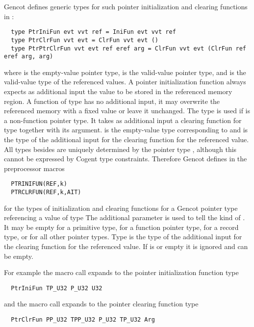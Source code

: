 Gencot defines generic types for such pointer initialization and clearing functions in :
\begin{verbatim}
  type PtrIniFun evt vvt ref = IniFun evt vvt ref
  type PtrClrFun vvt evt = ClrFun vvt evt ()
  type PtrPtrClrFun vvt evt ref eref arg = ClrFun vvt evt (ClrFun ref eref arg, arg)
\end{verbatim}
where  is the empty-value pointer type,  is the valid-value pointer type, and  is the valid-value
type of the referenced values. A pointer initialization function always expects as additional input the value to be stored in
the referenced memory region. A function of type  has no additional input, it may overwrite the referenced memory
with a fixed value or leave it unchanged. The type  is used if  is a non-function pointer type. It takes 
as additional input a clearing function for type  together with its argument.  is the empty-value type
corresponding to  and  is the type of the additional input for the clearing function for the referenced value. 
All types besides  are uniquely determined by the 
pointer type , although this cannot be expressed by Cogent type constraints. Therefore Gencot  defines in 
 the preprocessor macros
\begin{verbatim}
  PTRINIFUN(REF,k)
  PTRCLRFUN(REF,k,AIT)
\end{verbatim}
for the types of initialization and clearing functions for a Gencot pointer type referencing a value of type 
The additional parameter  is used to tell the kind of . It may be empty for a primitive type,
 for a function pointer type,  for a record type, or  for all other pointer types. Type 
is the type of the additional input for the clearing function for the referenced value. If  is  or
empty it is ignored and can be empty.

For example the macro call  expands to the pointer initialization function type
\begin{verbatim}
  PtrIniFun TP_U32 P_U32 U32
\end{verbatim}
and the macro call  expands to the pointer clearing function type
\begin{verbatim}
  PtrClrFun PP_U32 TPP_U32 P_U32 TP_U32 Arg
\end{verbatim}

